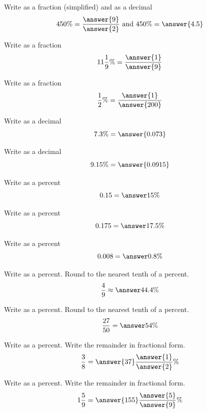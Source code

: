 \documentclass{ximera}
\begin{document}
\begin{problem}
Write as a fraction (simplified) and as a decimal
\[
450\% = \frac{\answer{9}}{\answer{2}} \text{ and } 450\% = \answer{4.5}
\]
\end{problem}

\begin{problem}
Write as a fraction 
\[
11 \frac{1}{9}\% = \frac{\answer{1}}{\answer{9}}
\]
\end{problem}

\begin{problem}
Write as a fraction
\[
\frac{1}{2}\% = \frac{\answer{1}}{\answer{200}}
\]
\end{problem}

\begin{problem}
Write as a decimal
\[
7.3\% = \answer{0.073}
\]
\end{problem}

\begin{problem}
Write as a decimal
\[
9.15\% = \answer{0.0915}
\]
\end{problem}

\begin{problem}
Write as a percent
\[
0.15 = \answer{15\%}
\]
\end{problem}

\begin{problem}
Write as a percent
\[
0.175 = \answer{17.5\%}
\]
\end{problem}

\begin{problem}
Write as a percent
\[
0.008 = \answer{0.8\%}
\]
\end{problem}

\begin{problem}
Write as a percent. Round to the nearest tenth of a percent.
\[
\frac{4}{9} \approx \answer{44.4\%}
\]
\end{problem}

\begin{problem}
Write as a percent. Round to the nearest tenth of a percent.
\[
\frac{27}{50} = \answer{54\%}
\]
\end{problem}

\begin{problem}
Write as a percent. Write the remainder in fractional form.
\[
\frac{3}{8}  = \answer{37} \frac{\answer{1}}{\answer{2}}\%
\]
\end{problem}

\begin{problem}
Write as a percent. Write the remainder in fractional form.
\[
1 \frac{5}{9}  = \answer{155} \frac{\answer{5}}{\answer{9}} \%
\]
\end{problem}
\end{document}
